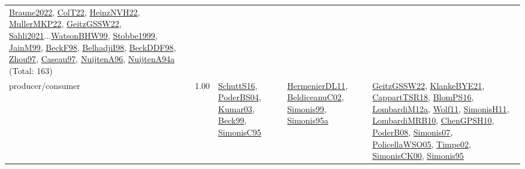 {\begin{longtable}{p{3cm}r>{\raggedright\arraybackslash}p{6cm}>{\raggedright\arraybackslash}p{6cm}>{\raggedright\arraybackslash}p{8cm}}
\hyperref[detail:Braune2022]{Braune2022}, \hyperref[detail:ColT22]{ColT22}, \hyperref[detail:HeinzNVH22]{HeinzNVH22}, \hyperref[detail:MullerMKP22]{MullerMKP22}, \hyperref[detail:GeitzGSSW22]{GeitzGSSW22}, \hyperref[detail:Sahli2021]{Sahli2021}...\hyperref[detail:WatsonBHW99]{WatsonBHW99}, \hyperref[detail:Stobbe1999]{Stobbe1999}, \hyperref[detail:JainM99]{JainM99}, \hyperref[detail:BeckF98]{BeckF98}, \hyperref[detail:BelhadjiI98]{BelhadjiI98}, \hyperref[detail:BeckDDF98]{BeckDDF98}, \hyperref[detail:Zhou97]{Zhou97}, \hyperref[detail:Caseau97]{Caseau97}, \hyperref[detail:NuijtenA96]{NuijtenA96}, \hyperref[detail:NuijtenA94a]{NuijtenA94a} (Total: 163)\\
\index{producer/consumer}\index{Concepts!producer/consumer}producer/consumer &  1.00 & \hyperref[detail:SchuttS16]{SchuttS16}, \hyperref[detail:PoderBS04]{PoderBS04}, \hyperref[detail:Kumar03]{Kumar03}, \hyperref[detail:Beck99]{Beck99}, \hyperref[detail:SimonisC95]{SimonisC95} & \hyperref[detail:HermenierDL11]{HermenierDL11}, \hyperref[detail:BeldiceanuC02]{BeldiceanuC02}, \hyperref[detail:Simonis99]{Simonis99}, \hyperref[detail:Simonis95a]{Simonis95a} & \hyperref[detail:GeitzGSSW22]{GeitzGSSW22}, \hyperref[detail:KlankeBYE21]{KlankeBYE21}, \hyperref[detail:CappartTSR18]{CappartTSR18}, \hyperref[detail:BlomPS16]{BlomPS16}, \hyperref[detail:LombardiM12a]{LombardiM12a}, \hyperref[detail:Wolf11]{Wolf11}, \hyperref[detail:SimonisH11]{SimonisH11}, \hyperref[detail:LombardiMRB10]{LombardiMRB10}, \hyperref[detail:ChenGPSH10]{ChenGPSH10}, \hyperref[detail:PoderB08]{PoderB08}, \hyperref[detail:Simonis07]{Simonis07}, \hyperref[detail:PolicellaWSO05]{PolicellaWSO05}, \hyperref[detail:Timpe02]{Timpe02}, \hyperref[detail:SimonisCK00]{SimonisCK00}, \hyperref[detail:Simonis95]{Simonis95}\\

\end{longtable}}
